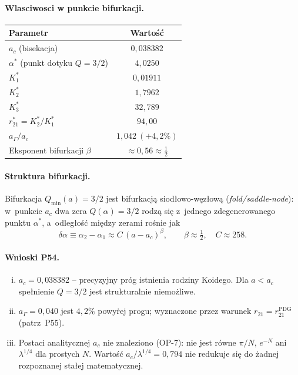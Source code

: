 \paragraph{Wlasciwosci w punkcie bifurkacji.}
\begin{center}
\begin{tabular}{lc}
\toprule
Parametr & Warto\'s\'c \\\midrule
$a_c$ (bisekacja) & $0{,}038382$ \\
$\alpha^*$ (punkt dotyku $Q=3/2$) & $4{,}0250$ \\
$K_1^*$ & $0{,}01911$ \\
$K_2^*$ & $1{,}7962$ \\
$K_3^*$ & $32{,}789$ \\
$r_{21}^* = K_2^*/K_1^*$ & $94{,}00$ \\
$a_\Gamma/a_c$ & $1{,}042\ (+4{,}2\%)$ \\
Eksponent bifurkacji $\beta$ & $\approx0{,}56\approx\tfrac{1}{2}$\\\bottomrule
\end{tabular}
\end{center}

\paragraph{Struktura bifurkacji.}
Bifurkacja $Q_{\min}(a)=3/2$ jest bifurkacj\k{a} siod\l{}owo-w\k{e}z\l{}ow\k{a}
(\emph{fold/saddle-node}): w~punkcie $a_c$ dwa zera $Q(\alpha)=3/2$
rodz\k{a} si\k{e} z~jednego zdegenerowanego punktu $\alpha^*$, a~odleg\l{}o\'s\'c
mi\k{e}dzy zerami ro\'snie jak
\begin{equation}\label{eq:p54-beta}
  \delta\alpha \equiv \alpha_2 - \alpha_1
  \approx C\,(a-a_c)^{\beta},
  \qquad
  \beta \approx \tfrac{1}{2},\quad C\approx258.
\end{equation}

\paragraph{Wnioski P54.}
\begin{enumerate}[(i)]
  \item $a_c=0{,}038382$ -- precyzyjny pr\'og istnienia rodziny Koidego.
        Dla $a<a_c$ spe\l{}nienie $Q=3/2$ jest strukturalnie niemo\.zliwe.
  \item $a_\Gamma=0{,}040$ jest $4{,}2\%$ powy\.rej progu;
        wyznaczone przez warunek $r_{21}=r_{21}^{\mathrm{PDG}}$
        (patrz~P55).
  \item Postaci analitycznej $a_c$ nie znaleziono (OP-7):
        nie jest r\'owne $\pi/N$, $e^{-N}$ ani $\lambda^{1/4}$
        dla prostych $N$.
        Warto\'s\'c $a_c/\lambda^{1/4}=0{,}794$ nie redukuje si\k{e}
        do \.zadnej rozpoznanej sta\l{}ej matematycznej.
\end{enumerate}

